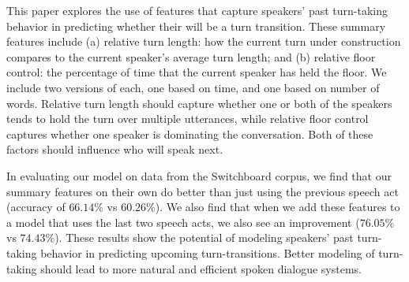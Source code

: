 This paper explores the use of features that capture speakers' past turn-taking behavior in predicting whether their will be a turn transition.  These summary features include (a) relative turn length: how the current turn under construction compares to the current speaker's average turn length; and (b) relative floor control: the percentage of time that the current speaker has held the floor.  We include two versions of each, one based on time, and one based on number of words.
%
Relative turn length should capture whether one or both of the speakers tends to hold the turn over multiple utterances, while relative floor control captures whether one speaker is dominating the conversation.  Both of these factors should influence who will speak next.

In evaluating our model on data from the Switchboard corpus, we find that our summary features on their own do better than just using the previous speech act (accuracy of $66.14\%$ vs $60.26\%$).  We also find that when we add these features to a model that uses the last two speech acts, we also see an improvement ($76.05\%$ vs $74.43\%$).  These results show the potential of modeling speakers' past turn-taking behavior in predicting upcoming turn-transitions.  Better modeling of turn-taking should lead to more natural and efficient spoken dialogue systems.
